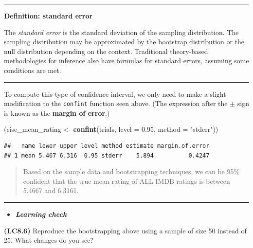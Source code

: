 \documentclass[]{tufte-book}
\newenvironment{Shaded}{\begin{snugshade}}{\end{snugshade}}
\newcommand{\KeywordTok}[1]{\textcolor[rgb]{0.13,0.29,0.53}{\textbf{{#1}}}}
\newcommand{\DataTypeTok}[1]{\textcolor[rgb]{0.13,0.29,0.53}{{#1}}}
\newcommand{\FloatTok}[1]{\textcolor[rgb]{0.00,0.00,0.81}{{#1}}}
\newcommand{\StringTok}[1]{\textcolor[rgb]{0.31,0.60,0.02}{{#1}}}
\newcommand{\NormalTok}[1]{{#1}}
\let\oldrule=\rule
\renewcommand{\rule}[1]{\oldrule{\linewidth}}
\newenvironment{rmdblock}[1]
  {\begin{shaded*}
  \begin{itemize}
  \renewcommand{\labelitemi}{
    \raisebox{-.7\height}[0pt][0pt]{
    }
  }
  \item
  }
  {
  \end{itemize}
  \end{shaded*}
  }
\newenvironment{learncheck}
  {\begin{rmdblock}{warning}}
  {\end{rmdblock}}
\begin{document}
\begin{center}\rule{0.5\linewidth}{\linethickness}\end{center}

\textbf{Definition: standard error}

The \emph{standard error} is the standard deviation of the sampling
distribution. The sampling distribution may be approximated by the
bootstrap distribution or the null distribution depending on the
context. Traditional theory-based methodologies for inference also have
formulas for standard errors, assuming some conditions are met.

\begin{center}\rule{0.5\linewidth}{\linethickness}\end{center}

To compute this type of confidence interval, we only need to make a
slight modification to the \texttt{confint} function seen above. (The
expression after the \(\pm\) sign is known as the \textbf{margin of
error}.)

\begin{Shaded}
\begin{Highlighting}[]
\NormalTok{(cise_mean_rating <-}\StringTok{ }\KeywordTok{confint}\NormalTok{(trials, }\DataTypeTok{level =} \FloatTok{0.95}\NormalTok{, }\DataTypeTok{method =} \StringTok{"stderr"}\NormalTok{))}
\end{Highlighting}
\end{Shaded}

\begin{verbatim}
##   name lower upper level method estimate margin.of.error
## 1 mean 5.467 6.316  0.95 stderr    5.894          0.4247
\end{verbatim}

\begin{quote}
Based on the sample data and bootstrapping techniques, we can be 95\%
confident that the true mean rating of ALL IMDB ratings is between
5.4667 and 6.3161.
\end{quote}

\begin{center}\rule{0.5\linewidth}{\linethickness}\end{center}

\begin{learncheck}
\textbf{\emph{Learning check}}
\end{learncheck}

\textbf{(LC8.6)} Reproduce the bootstrapping above using a sample of
size 50 instead of 25. What changes do you see?
\end{document}

